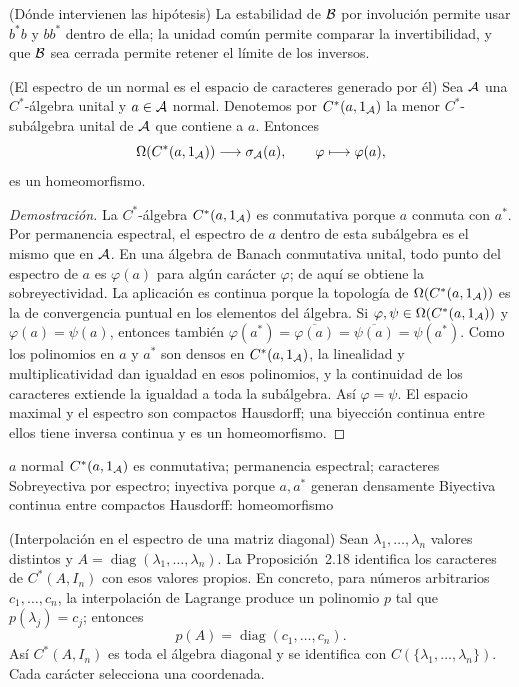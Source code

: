 \begin{cthnota}{(Dónde intervienen las hipótesis)}
La estabilidad de $\mathcal B$ por involución permite usar $b^*b$ y $bb^*$ dentro de ella;
la unidad común permite comparar la invertibilidad, y que $\mathcal B$ sea cerrada
permite retener el límite de los inversos.
\end{cthnota}


\begin{cthproposicion}{(El espectro de un normal es el espacio de caracteres generado por él)}
Sea $\mathcal A$ una $C^*$-álgebra unital y $a\in\mathcal A$ normal. Denotemos por
$C^*(a,1_\mathcal A)$ la menor
$C^*$-subálgebra unital de $\mathcal A$ que contiene a $a$. Entonces
\[
 \Omega(C^*(a,1_\mathcal A))\longrightarrow\sigma_\mathcal A(a),\qquad
 \varphi\longmapsto\varphi(a),
\]
es un homeomorfismo.
\end{cthproposicion}

\begin{proof}[Demostración]
La $C^*$-álgebra $C^*(a,1_\mathcal A)$ es conmutativa porque $a$ conmuta con $a^*$.
Por permanencia espectral,
el espectro de $a$ dentro de esta subálgebra es el mismo que en $\mathcal A$.
En una álgebra de Banach conmutativa unital, todo punto del espectro de $a$
es $\varphi(a)$ para algún carácter $\varphi$; de aquí se obtiene la
sobreyectividad. La aplicación es continua porque la topología de
$\Omega(C^*(a,1_\mathcal A))$ es la de convergencia puntual en los elementos del
álgebra. Si $\varphi,\psi\in\Omega(C^*(a,1_\mathcal A))$ y
$\varphi(a)=\psi(a)$, entonces también
$\varphi(a^*)=\overline{\varphi(a)}=\overline{\psi(a)}=\psi(a^*)$. Como los polinomios en
$a$ y $a^*$ son densos en $C^*(a,1_\mathcal A)$, la linealidad y multiplicatividad dan
igualdad en esos polinomios, y la continuidad de los caracteres extiende la
igualdad a toda la subálgebra. Así $\varphi=\psi$. El espacio maximal y el
espectro son compactos Hausdorff; una biyección continua entre ellos tiene
inversa continua y es un homeomorfismo.
\end{proof}

\proofdiagram
{$a$ normal}
{$C^*(a,1_\mathcal A)$ es conmutativa; permanencia espectral; caracteres}
{Sobreyectiva por espectro; inyectiva porque $a,a^*$ generan densamente}
{Biyectiva continua entre compactos Hausdorff: homeomorfismo}

\begin{cthejemplo}{(Interpolación en el espectro de una matriz diagonal)}
Sean $\lambda_1,\ldots,\lambda_n$ valores distintos y
$A=\operatorname{diag}(\lambda_1,\ldots,\lambda_n)$.
La Proposición~2.18 identifica los caracteres de $C^*(A,I_n)$ con esos
valores propios. En concreto, para números arbitrarios $c_1,\ldots,c_n$,
la interpolación de Lagrange produce un polinomio $p$ tal que
$p(\lambda_j)=c_j$; entonces
\[
 p(A)=\operatorname{diag}(c_1,\ldots,c_n).
\]
Así $C^*(A,I_n)$ es toda el álgebra diagonal y se identifica con
$C(\{\lambda_1,\ldots,\lambda_n\})$. Cada carácter selecciona una coordenada.
\end{cthejemplo}

